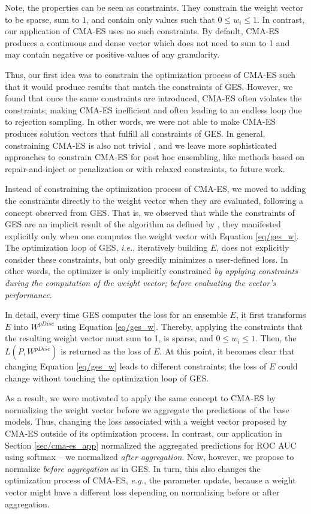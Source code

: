 \documentclass[11pt]{article}
\begin{document}
Note, the properties can be seen as constraints. 
They constrain the weight vector to be sparse, sum to $1$, and contain only values such that $0 \leq w_i \leq 1$. 
In contrast, our application of CMA-ES uses no such constraints. 
By default, CMA-ES produces a continuous and dense vector which does not need to sum to 1 and may contain negative or positive values of any granularity. 

Thus, our first idea was to constrain the optimization process of CMA-ES such that it would produce results that match the constraints of GES.
However, we found that once the same constraints are introduced, CMA-ES often violates the constraints; making CMA-ES inefficient and often leading to an endless loop due to rejection sampling. 
In other words, we were not able to make CMA-ES produces solution vectors that fulfill all constraints of GES. 
In general, constraining CMA-ES is also not trivial \citep{DBLP:journals/swevo/Biedrzycki20}, and we leave more sophisticated approaches to constrain CMA-ES for post hoc ensembling, like methods based on repair-and-inject or penalization \citep{cma/HansenTutorial2016} or with relaxed constraints, to future work. 

Instead of constraining the optimization process of CMA-ES, we moved to adding the constraints directly to the weight vector when they are evaluated, following a concept observed from GES.
That is, we observed that while the constraints of GES are an implicit result of the algorithm as defined by \cite{caruana2004}, they manifested explicitly only when one computes the weight vector with Equation \ref{eq/ges_w}.
The optimization loop of GES, \emph{i.e.}, iteratively building $E$, does not explicitly consider these constraints, but only greedily minimizes a user-defined loss.
In other words, the optimizer is only implicitly constrained \emph{by applying constraints during the computation of the weight vector; before evaluating the vector's performance}.

In detail, every time GES computes the loss for an ensemble $E$, it first transforms $E$ into $W^{pDisc}$ using Equation \ref{eq/ges_w}. 
Thereby, applying the constraints that the resulting weight vector must sum to 1, is sparse, and $0 \leq w_i \leq 1$. 
Then, the $L(P, W^{pDisc})$ is returned as the loss of $E$.
At this point, it becomes clear that changing Equation \ref{eq/ges_w} leads to different constraints; the loss of $E$ could change without touching the optimization loop of GES. 

As a result, we were motivated to apply the same concept to CMA-ES by normalizing the weight vector before we aggregate the predictions of the base models. 
Thus, changing the loss associated with a weight vector proposed by CMA-ES outside of its optimization process. 
In contrast, our application in Section \ref{sec/cma-es_app} normalized the aggregated predictions for ROC AUC using softmax -- we normalized \emph{after aggregation}. 
Now, however, we propose to normalize \emph{before aggregation} as in GES. 
In turn, this also changes the optimization process of CMA-ES, \emph{e.g.}, the parameter update, because a weight vector might have a different loss depending on normalizing before or after aggregation.
\end{document}
